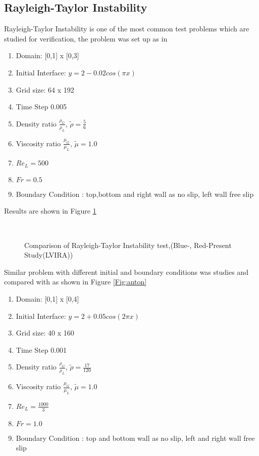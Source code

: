   \subsection{Rayleigh-Taylor Instability}
  Rayleigh-Taylor Instability is one of the most common test problems which are studied for verification, the problem was set up as in \cite{Rudman1997}
   \begin{enumerate}
 \item Domain: [0,1] x [0,3]
 \item Initial Interface: $y=2-0.02cos(\pi x)$
 \item Grid size: 64 x 192
 \item Time Step 0.005
 \item Density ratio $\frac{\rho_G}{\rho_L}$, $\tilde\rho=\frac{5}{6}$
 \item Viscosity ratio $\frac{\mu_G}{\mu_L}$, $\tilde\mu=1.0$ 
 \item $Re_L=500$
 \item $Fr = 0.5$
  \item Boundary Condition : top,bottom and right wall as no slip, left wall free slip
 \end{enumerate}
 Results are shown in Figure \ref{Fig:rudman}
 \begin{figure}
 \centering
   \\
 \caption{Comparison of Rayleigh-Taylor Instability test,(Blue-\cite{Rudman1997}, Red-Present Study(LVIRA))}
  \label{Fig:rudman}
 \end{figure}
 
 Similar problem with different initial and boundary conditions was studies and compared with \cite{Anton2001} as shown in Figure \ref{Fig:anton}
    \begin{enumerate}
 \item Domain: [0,1] x [0,4]
 \item Initial Interface: $y=2+0.05cos(2\pi x)$
 \item Grid size: 40 x 160
 \item Time Step 0.001
 \item Density ratio $\frac{\rho_G}{\rho_L}$, $\tilde\rho=\frac{17}{120}$
 \item Viscosity ratio $\frac{\mu_G}{\mu_L}$, $\tilde\mu=1.0$ 
 \item $Re_L=\frac{1000}{3}$
 \item $Fr = 1.0$
 \item Boundary Condition : top and bottom wall as no slip, left and right wall free slip
 \end{enumerate}
 
